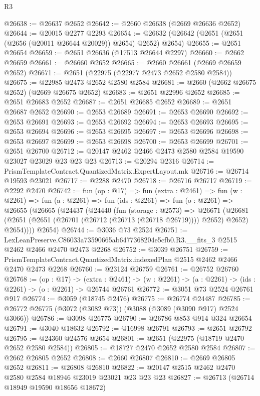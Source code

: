 \begin{lexlean}{R3}
\begin{coremodule}
@26638 := @26637 @2652
@26642 := @2660 @26638 (@2669 @26636 @2652)
@26644 := @20015 @2277 @2293
@26654 := @26632 (@26642 (@2651 (@2651 (@2656 (@20011 @26644 @20029)) @2654) @2652) @2654)
@26655 := @2651 @26654
@26659 := @2651 @26636 (@17513 @26644 @2297)
@26660 := @2662 @26659
@26661 := @26660 @2652
@26665 := @2660 @26661 (@2669 @26659 @2652)
@26671 := @2651 (@22975 (@22977 @2473 @2652 @2580 @2584))
@26675 := @22985 @2473 @2652 @2580 @2584
@26681 := @2660 (@2662 @26675 @2652) (@2669 @26675 @2652)
@26683 := @2651 @22996 @2652
@26685 := @2651 @26683 @2652
@26687 := @2651 @26685 @2652
@26689 := @2651 @26687 @2652
@26690 := @2653 @26689
@26691 := @2653 @26690
@26692 := @2653 @26691
@26693 := @2653 @26692
@26694 := @2653 @26693
@26695 := @2653 @26694
@26696 := @2653 @26695
@26697 := @2653 @26696
@26698 := @2653 @26697
@26699 := @2653 @26698
@26700 := @2653 @26699
@26701 := @2651 @26700
@26712 := @20147 @2462 @2466 @2473 @2580 @2584 @19590 @23027 @23029 @23 @23 @23
@26713 := @20294 @2316
@26714 := PrismTemplateContract.QuantizedMatrix.ExpertLayout.mk
@26716 := @26714 @19593 @23021
@26717 := @2288 @2470
@26718 := @26716 @26717
@26719 := @2292 @2470
@26742 := fun (op : @17) =>
  fun (extra : @2461) =>
  fun (w : @2261) =>
  fun (a : @2261) =>
  fun (ids : @2261) =>
  fun (o : @2261) =>
  @26655
    (@26665
      (@24437
        (@24440
          (fun (storage : @2573) =>
          @26671
            (@26681 (@2651 (@2651 (@26701 (@26712 (@26713 (@26718 @26719)))) @2652) @2652) @2654))))
      @2654)
@26744 := @3036 @73 @2524
@26751 := LexLeanPreserve.C86033a73590665ab6477368204e5cfb0.R3.__fits_3
    @2515
    @2462
    @2466
    @2470
    @2473
    @2268
@26752 := @3039 @26751
@26759 := PrismTemplateContract.QuantizedMatrix.indexedPlan @2515 @2462 @2466 @2470 @2473 @2268
@26760 := @23124 @26759
@26761 := @26752 @26760
@26768 := (op : @17) ->
  (extra : @2461) -> (w : @2261) -> (a : @2261) -> (ids : @2261) -> (o : @2261) -> @26744 @26761
@26772 := @3051 @73 @2524 @26761 @917
@26774 := @3059 (@18745 @2476)
@26775 := @26774 @24487
@26785 := @26772 @26775 (@3072 (@3082 @73)) (@3088 (@3089 (@3090 @917) @2524 @3066))
@26786 := @3098 @26775
@26790 := @26786 @853 @914 @324 @26654
@26791 := @3040 @18632
@26792 := @16998 @26791
@26793 := @2651 @26792
@26795 := @24360 @24576 @2654
@26801 := @2651 (@22975 (@18719 @2470 @2652 @2580 @2584))
@26805 := @18727 @2470 @2652 @2580 @2584
@26807 := @2662 @26805 @2652
@26808 := @2660 @26807
@26810 := @2669 @26805 @2652
@26811 := @26808 @26810
@26822 := @20147 @2515 @2462 @2470 @2580 @2584 @18946 @23019 @23021 @23 @23 @23
@26827 := @26713 (@26714 @18949 @19590 @18656 @18672)

\end{coremodule}
\end{lexlean}
